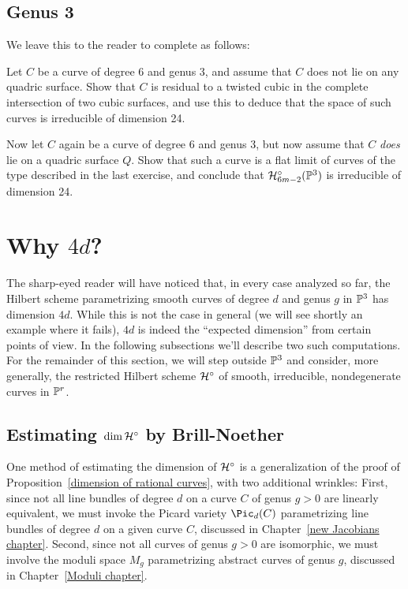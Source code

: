 \subsection{Genus 3}
We leave this to the reader to complete as follows:

\begin{exercise}
Let $C$ be a curve of degree 6 and genus 3, and assume that $C$ does not lie on any quadric surface. Show that $C$ is residual to a twisted cubic in the complete intersection of two cubic surfaces, and use this to deduce that the space of such curves is irreducible of dimension 24.
\end{exercise}


\begin{exercise}
Now let $C$ again be a curve of degree 6 and genus 3, but now assume that $C$ \emph{does} lie on a quadric surface $Q$. Show that such a curve is a flat limit of curves of the type described in the last exercise, and conclude that $\cH^\circ_{6m-2}(\PP^3)$ is irreducible of dimension 24.  \end{exercise}



\section{Why  $4d$?}\label{estimating dim hilb}

The sharp-eyed reader will have noticed that, in every case analyzed so far,  the Hilbert scheme parametrizing smooth curves of degree $d$ and genus $g$ in $\PP^3$ has dimension $4d$. While this is not the case in general (we will see shortly an example where it fails), $4d$ is indeed the ``expected dimension'' from certain points of view. In the following subsections we'll describe two such computations. For the remainder of this section, we will step outside $\PP^3$ and consider, more generally, the restricted Hilbert scheme $\cH^\circ$ of smooth, irreducible, nondegenerate curves in $\PP^r$.

\subsection{Estimating $\dim \cH^\circ$ by Brill-Noether}

One method of estimating  the dimension of $\cH^\circ$ is a generalization of the proof of Proposition~\ref{dimension of rational curves}, with two additional wrinkles: First, since not all line bundles of degree $d$ on a curve $C$ of genus $g > 0$ are linearly equivalent, we must invoke the Picard variety $\Pic_d(C)$ parametrizing line bundles of degree $d$ on a given curve $C$, discussed in Chapter~\ref{new Jacobians chapter}. Second, since not all curves of genus $g > 0$ are isomorphic, we must involve the moduli space  $M_g$ parametrizing abstract curves of genus $g$, discussed in Chapter~\ref{Moduli chapter}.


